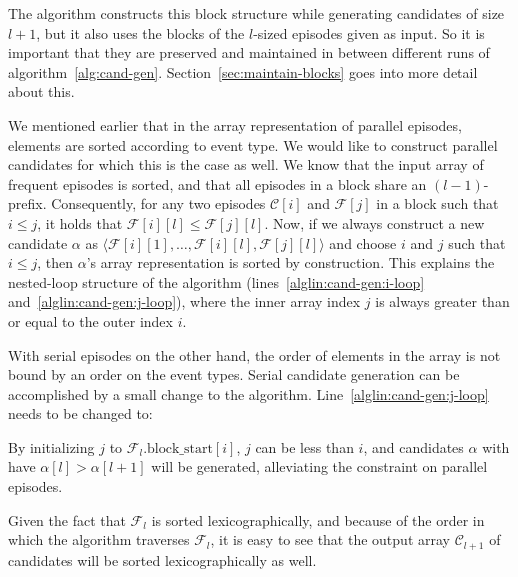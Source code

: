 The algorithm constructs this block structure while generating candidates of size $ l + 1 $, but it also uses the blocks of the $ l $-sized episodes given as input. So it is important that they are preserved and maintained in between different runs of algorithm~\ref{alg:cand-gen}. Section~\ref{sec:maintain-blocks} goes into more detail about this.

We mentioned earlier that in the array representation of parallel episodes, elements are sorted according to event type. We would like to construct parallel candidates for which this is the case as well. We know that the input array of frequent episodes is sorted, and that all episodes in a block share an $ (l - 1) $-prefix. Consequently, for any two episodes $ \mathcal{C}[i] $ and $ \mathcal{F}[j] $ in a block such that $ i \leq j $, it holds that $ \mathcal{F}[i][l] \leq \mathcal{F}[j][l] $.
Now, if we always construct a new candidate $ \alpha $ as $ \langle \mathcal{F}[i][1], \ldots,\allowbreak\mathcal{F}[i][l],\allowbreak\mathcal{F}[j][l] \rangle $ and choose $ i $ and $ j $ such that $ i \leq j $, then $ \alpha $'s array representation is sorted by construction. This explains the nested-loop structure of the algorithm (lines~\ref{alglin:cand-gen:i-loop} and~\ref{alglin:cand-gen:j-loop}), where the inner array index $ j $ is always greater than or equal to the outer index $ i $.

With serial episodes on the other hand, the order of elements in the array is not bound by an order on the event types.
Serial candidate generation can be accomplished by a small change to the algorithm. Line~\ref{alglin:cand-gen:j-loop} needs to be changed to:
\begin{algorithmic}[0]
\EndFor
\end{algorithmic}
By initializing $ j $ to $ \mathcal{F}_l \text{.block\_start}[i] $, $ j $ can be less than $ i $, and candidates $ \alpha $ with have $ \alpha[l] > \alpha[l + 1] $ will be generated, alleviating the constraint on parallel episodes.

Given the fact that $ \mathcal{F}_l $ is sorted lexicographically, and because of the order in which the algorithm traverses $ \mathcal{F}_l $, it is easy to see that the output array $ \mathcal{C}_{l + 1} $ of candidates will be sorted lexicographically as well.

